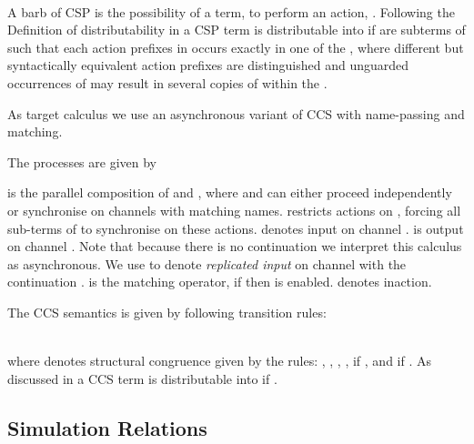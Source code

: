 \documentclass[]{eptcs}
\begin{document}
\vspace{-1.2em}\\
A barb of CSP is the possibility of a term, to perform an action, \ie .
Following the Definition of distributability in \cite{petersNestmannGoltz13} a CSP term  is distributable into  if  are subterms of  such that each action prefixes in  occurs exactly in one of the , where different but syntactically equivalent action prefixes are distinguished and unguarded occurrences of  may result in several copies of  within the .

As target calculus we use an asynchronous variant of CCS\cite{CCS} with name-passing and matching.

\begin{definition}\label{def:ccs_syntax}
  The processes  are given by
  
\end{definition}

 is the parallel composition of  and , where  and  can either proceed independently or synchronise on channels with matching names.
 restricts actions  on , forcing all sub-terms of  to synchronise on these actions.
 denotes input on channel .
 is output on channel .
Note that because there is no continuation we interpret this calculus as asynchronous.
We use  to denote \emph{replicated input} on channel  with the continuation .
 is the matching operator, if  then  is enabled.
 denotes inaction.

The CCS semantics is given by following transition rules:
\vspace{-0.6em}

\vspace{-1em}\\
where  denotes structural congruence given by the rules: ,
, , ,  if ,  and  if .
As discussed in \cite{petersNestmannGoltz13} a CCS term  is distributable into  if .

\subsection{Simulation Relations}
\end{document}
